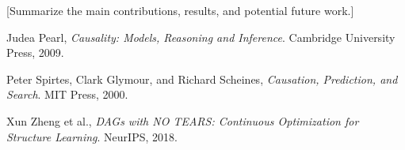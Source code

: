 \documentclass[a4paper]{article}
\begin{document}
[Summarize the main contributions, results, and potential future work.]

\begin{thebibliography}{9}
  Judea Pearl,
  \emph{Causality: Models, Reasoning and Inference}.
  Cambridge University Press, 2009.

  Peter Spirtes, Clark Glymour, and Richard Scheines,
  \emph{Causation, Prediction, and Search}.
  MIT Press, 2000.

  Xun Zheng et al.,
  \emph{DAGs with NO TEARS: Continuous Optimization for Structure Learning}.
  NeurIPS, 2018.
\end{thebibliography}
\end{document}
